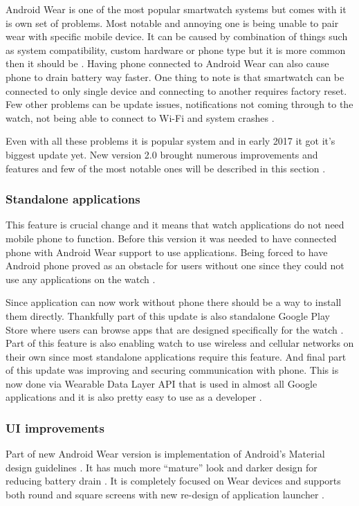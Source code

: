 Android Wear is one of the most popular smartwatch systems but comes with it is own set of problems. Most notable and annoying one is being unable to pair wear with specific mobile device. It can be caused by combination of things such as system compatibility, custom hardware or phone type but it is more common then it should be \cite{AWPaS}. Having phone connected to Android Wear can also cause phone to drain battery way faster. One thing to note is that smartwatch can be connected to only single device and connecting to another requires factory reset. Few other problems can be update issues, notifications not coming through to the watch, not being able to connect to Wi-Fi and system crashes \cite{WAWP}.

Even with all these problems it is popular system and in early 2017 it got it's biggest update yet. New version 2.0 brought numerous improvements and features and few of the most notable ones will be described in this section \cite{AW2UG, AW2WN, AW2N}.

\subsubsection{Standalone applications}\label{sec:StandaloneApplications}
This feature is crucial change and it means that watch applications do not need mobile phone to function. Before this version it was needed to have connected phone with Android Wear support to use applications. Being forced to have Android phone proved as an obstacle for users without one since they could not use any applications on the watch \cite{AW2UG, AW2WN}.

Since application can now work without phone there should be a way to install them directly. Thankfully part of this update is also standalone Google Play Store where users can browse apps that are designed specifically for the watch \cite{AW2WN}. Part of this feature is also enabling watch to use wireless and cellular networks on their own since most standalone applications require this feature. And final part of this update was improving and securing communication with phone. This is now done via Wearable Data Layer API that is used in almost all Google applications and it is also pretty easy to use as a developer \cite{AW2UG}. 

\subsubsection{UI improvements}\label{sec:UIImprovements}
Part of new Android Wear version is implementation of Android's Material design guidelines \cite{DoAW}. It has much more \enquote{mature} look and darker design for reducing battery drain \cite{AW2WN}. It is completely focused on Wear devices and supports both round and square screens with new re-design of application launcher \cite{AW2UG}.

